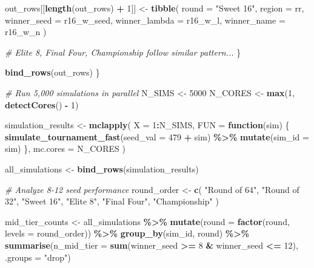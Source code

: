 \documentclass[
]{article}
\newenvironment{Shaded}{\begin{snugshade}}{\end{snugshade}}
\newcommand{\AttributeTok}[1]{\textcolor[rgb]{0.13,0.29,0.53}{#1}}
\newcommand{\CommentTok}[1]{\textcolor[rgb]{0.56,0.35,0.01}{\textit{#1}}}
\newcommand{\ControlFlowTok}[1]{\textcolor[rgb]{0.13,0.29,0.53}{\textbf{#1}}}
\newcommand{\DecValTok}[1]{\textcolor[rgb]{0.00,0.00,0.81}{#1}}
\newcommand{\FunctionTok}[1]{\textcolor[rgb]{0.13,0.29,0.53}{\textbf{#1}}}
\newcommand{\NormalTok}[1]{#1}
\newcommand{\OtherTok}[1]{\textcolor[rgb]{0.56,0.35,0.01}{#1}}
\newcommand{\SpecialCharTok}[1]{\textcolor[rgb]{0.81,0.36,0.00}{\textbf{#1}}}
\newcommand{\StringTok}[1]{\textcolor[rgb]{0.31,0.60,0.02}{#1}}
\begin{document}
\begin{Shaded}
\begin{Highlighting}[]
\NormalTok{        out\_rows[[}\FunctionTok{length}\NormalTok{(out\_rows) }\SpecialCharTok{+} \DecValTok{1}\NormalTok{]] }\OtherTok{\textless{}{-}} \FunctionTok{tibble}\NormalTok{(}
            \AttributeTok{round =} \StringTok{"Sweet 16"}\NormalTok{, }\AttributeTok{region =}\NormalTok{ rr,}
            \AttributeTok{winner\_seed =}\NormalTok{ r16\_w\_seed, }\AttributeTok{winner\_lambda =}\NormalTok{ r16\_w\_l, }\AttributeTok{winner\_name =}\NormalTok{ r16\_w\_n}
\NormalTok{        )}

        \CommentTok{\# Elite 8, Final Four, Championship follow similar pattern...}
\NormalTok{    \}}

    \FunctionTok{bind\_rows}\NormalTok{(out\_rows)}
\NormalTok{\}}

\CommentTok{\# Run 5,000 simulations in parallel}
\NormalTok{N\_SIMS }\OtherTok{\textless{}{-}} \DecValTok{5000}
\NormalTok{N\_CORES }\OtherTok{\textless{}{-}} \FunctionTok{max}\NormalTok{(}\DecValTok{1}\NormalTok{, }\FunctionTok{detectCores}\NormalTok{() }\SpecialCharTok{{-}} \DecValTok{1}\NormalTok{)}

\NormalTok{simulation\_results }\OtherTok{\textless{}{-}} \FunctionTok{mclapply}\NormalTok{(}
    \AttributeTok{X =} \DecValTok{1}\SpecialCharTok{:}\NormalTok{N\_SIMS,}
    \AttributeTok{FUN =} \ControlFlowTok{function}\NormalTok{(sim) \{}
        \FunctionTok{simulate\_tournament\_fast}\NormalTok{(}\AttributeTok{seed\_val =} \DecValTok{479} \SpecialCharTok{+}\NormalTok{ sim) }\SpecialCharTok{\%\textgreater{}\%}
            \FunctionTok{mutate}\NormalTok{(}\AttributeTok{sim\_id =}\NormalTok{ sim)}
\NormalTok{    \},}
    \AttributeTok{mc.cores =}\NormalTok{ N\_CORES}
\NormalTok{)}

\NormalTok{all\_simulations }\OtherTok{\textless{}{-}} \FunctionTok{bind\_rows}\NormalTok{(simulation\_results)}

\CommentTok{\# Analyze 8{-}12 seed performance}
\NormalTok{round\_order }\OtherTok{\textless{}{-}} \FunctionTok{c}\NormalTok{(}
    \StringTok{"Round of 64"}\NormalTok{, }\StringTok{"Round of 32"}\NormalTok{, }\StringTok{"Sweet 16"}\NormalTok{,}
    \StringTok{"Elite 8"}\NormalTok{, }\StringTok{"Final Four"}\NormalTok{, }\StringTok{"Championship"}
\NormalTok{)}

\NormalTok{mid\_tier\_counts }\OtherTok{\textless{}{-}}\NormalTok{ all\_simulations }\SpecialCharTok{\%\textgreater{}\%}
    \FunctionTok{mutate}\NormalTok{(}\AttributeTok{round =} \FunctionTok{factor}\NormalTok{(round, }\AttributeTok{levels =}\NormalTok{ round\_order)) }\SpecialCharTok{\%\textgreater{}\%}
    \FunctionTok{group\_by}\NormalTok{(sim\_id, round) }\SpecialCharTok{\%\textgreater{}\%}
    \FunctionTok{summarise}\NormalTok{(}\AttributeTok{n\_mid\_tier =} \FunctionTok{sum}\NormalTok{(winner\_seed }\SpecialCharTok{\textgreater{}=} \DecValTok{8} \SpecialCharTok{\&}\NormalTok{ winner\_seed }\SpecialCharTok{\textless{}=} \DecValTok{12}\NormalTok{), }\AttributeTok{.groups =} \StringTok{"drop"}\NormalTok{)}


\end{Highlighting}
\end{Shaded}
\end{document}
